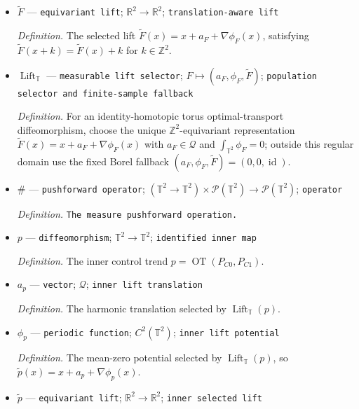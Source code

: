 \documentclass{article}
\begin{document}
\begin{itemize}
  \par\smallskip\noindent\emph{Definition.} The mean-zero periodic potential satisfying \(\int_{\mathbb T^2}\phi_F=0\) for the selected lift of \(F\).
  \item \(\widetilde F\) --- \texttt{equivariant lift}; \(\mathbb R^2\to\mathbb R^2\); \texttt{translation-\allowbreak{}aware lift}
  \par\smallskip\noindent\emph{Definition.} The selected lift \(\widetilde F(x)=x+a_F+\nabla\phi_F(x)\), satisfying \(\widetilde F(x+k)=\widetilde F(x)+k\) for \(k\in\mathbb Z^2\).
  \item \(\operatorname{Lift}_{\mathbb T}\) --- \texttt{measurable lift selector}; \(F\mapsto(a_F,\phi_F,\widetilde F)\); \texttt{population selector and finite-\allowbreak{}sample fallback}
  \par\smallskip\noindent\emph{Definition.} For an identity-homotopic torus optimal-transport diffeomorphism, choose the unique \(\mathbb Z^2\)-equivariant representation \(\widetilde F(x)=x+a_F+\nabla\phi_F(x)\) with \(a_F\in\mathcal Q\) and \(\int_{\mathbb T^2}\phi_F=0\); outside this regular domain use the fixed Borel fallback \((a_F,\phi_F,\widetilde F)=(0,0,\operatorname{id})\).
  \item \(\#\) --- \texttt{pushforward operator}; \((\mathbb T^2\to\mathbb T^2)\times\mathcal P(\mathbb T^2)\to\mathcal P(\mathbb T^2)\); \texttt{operator}
  \par\smallskip\noindent\emph{Definition.} \texttt{The measure pushforward operation.}
  \item \(p\) --- \texttt{diffeomorphism}; \(\mathbb T^2\to\mathbb T^2\); \texttt{identified inner map}
  \par\smallskip\noindent\emph{Definition.} The inner control trend \(p=\operatorname{OT}(P_{C0},P_{C1})\).
  \item \(a_p\) --- \texttt{vector}; \(\mathcal Q\); \texttt{inner lift translation}
  \par\smallskip\noindent\emph{Definition.} The harmonic translation selected by \(\operatorname{Lift}_{\mathbb T}(p)\).
  \item \(\phi_p\) --- \texttt{periodic function}; \(C^2(\mathbb T^2)\); \texttt{inner lift potential}
  \par\smallskip\noindent\emph{Definition.} The mean-zero potential selected by \(\operatorname{Lift}_{\mathbb T}(p)\), so \(\widetilde p(x)=x+a_p+\nabla\phi_p(x)\).
  \item \(\widetilde p\) --- \texttt{equivariant lift}; \(\mathbb R^2\to\mathbb R^2\); \texttt{inner selected lift}

\end{itemize}
\end{document}
